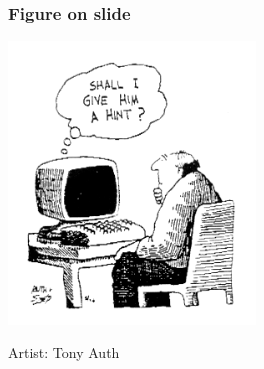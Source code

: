 \documentclass[english,hangout]{FrankfurtUAS}
\begin{document}
\begin{frame}
\frametitle{Figure on slide}
\begin{center}
\vspace{-2.2em}
\includegraphics[height=7.5cm]{shall_i_give_him_a_hint.png}
\end{center}
\vspace{-6mm}
\tiny Artist: Tony Auth
\end{frame}
\end{document}
